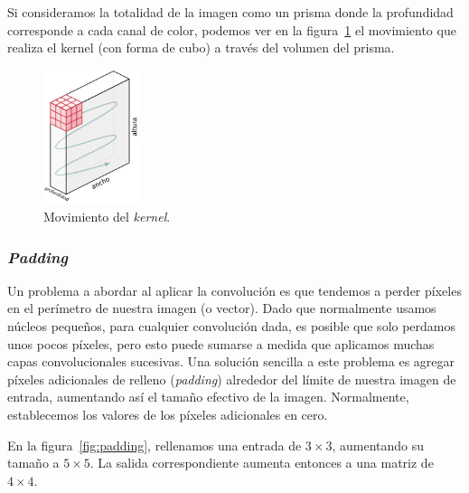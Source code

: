 \documentclass[a4paper,12pt]{article}
\begin{document}
\clearpage

Si consideramos la totalidad de la imagen como un prisma donde la profundidad corresponde a cada canal de color, podemos ver en la figura~\ref{fig:kernelmove} el movimiento que realiza el kernel (con forma de cubo) a través del volumen del prisma.

\begin{figure}[H]
	\begin{center}				
		\includegraphics[width=0.25\textwidth]{kernelmove.png}
		\caption{Movimiento del \textit{kernel}.}
		\label{fig:kernelmove}
	\end{center}
\end{figure}

\subsubsection{\textit{Padding}}

Un problema a abordar al aplicar la convolución es que tendemos a perder píxeles en el perímetro de nuestra imagen (o vector). Dado que normalmente usamos núcleos pequeños, para cualquier convolución dada, es posible que solo perdamos unos pocos píxeles, pero esto puede sumarse a medida que aplicamos muchas capas convolucionales sucesivas. Una solución sencilla a este problema es agregar píxeles adicionales de relleno (\textit{padding}) alrededor del límite de nuestra imagen de entrada, aumentando así el tamaño efectivo de la imagen. Normalmente, establecemos los valores de los píxeles adicionales en cero. \citep{padding}

En la figura~\ref{fig:padding}, rellenamos una entrada de $3 \times 3$, aumentando su tamaño a $5 \times 5$. La salida correspondiente aumenta entonces a una matriz de $4 \times 4$.
\end{document}

